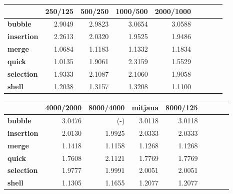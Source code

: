 \noindent
\begin{tabular}{lrrrrrrrr}
\toprule
{} &  250/125 &  500/250 &  1000/500 &  2000/1000 \\
\midrule
\textbf{bubble   } &     2.9049 &     2.9823 &   3.0654 &    3.0588 \\
\textbf{insertion} &     2.2613 &     2.0320 &   1.9525 &    1.9486 \\
\textbf{merge    } &     1.0684 &     1.1183 &   1.1332 &    1.1834 \\
\textbf{quick    } &     1.0135 &     1.9061 &   2.3159 &    1.5529 \\
\textbf{selection} &     1.9333 &     2.1087 &   2.1060 &    1.9058 \\
\textbf{shell    } &     1.2038 &     1.3157 &   1.3208 &    1.1100 \\
\bottomrule
\end{tabular}

\noindent
\begin{tabular}{lrrrrrrrr}
\toprule
{} &  4000/2000 &  8000/4000 &  mitjana &  8000/125 \\
\midrule
\textbf{bubble   } &     3.0476 &        (-) &   3.0118 &    3.0118 \\
\textbf{insertion} &     2.0130 &     1.9925 &   2.0333 &    2.0333 \\
\textbf{merge    } &     1.1418 &     1.1158 &   1.1268 &    1.1268 \\
\textbf{quick    } &     1.7608 &     2.1121 &   1.7769 &    1.7769 \\
\textbf{selection} &     1.9777 &     1.9991 &   2.0051 &    2.0051 \\
\textbf{shell    } &     1.1305 &     1.1655 &   1.2077 &    1.2077 \\
\bottomrule
\end{tabular}